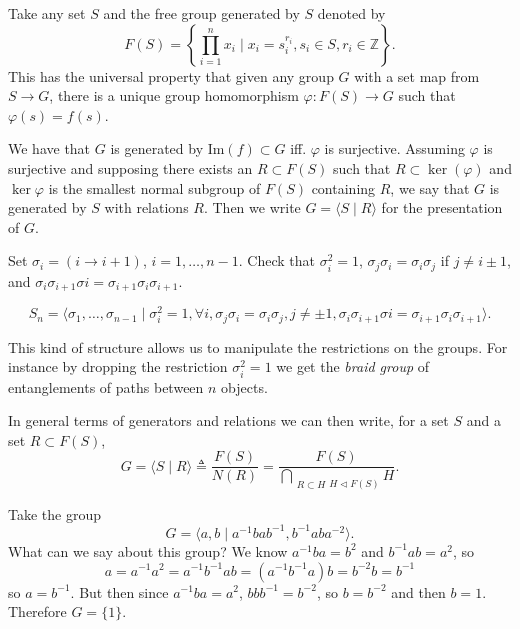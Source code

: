 \begin{defn}
Take any set $S$ and the
free group generated by $S$ denoted by
$$
F(S) = \left\{ \prod_{i = 1}^n x_i
         \mid x_i = s_i^{r_i}, s_i \in S,  r_i \in \mathbb{Z}
       \right\}.
$$
This has the universal property that given any group $G$ with a set
map from $S \to G$, there is a unique group homomorphism
$\varphi : F(S) \to G$ such that $\varphi(s) = f(s)$.

We have that $G$ is generated by $\mathrm{Im}(f) \subset G$
iff. $\varphi$ is surjective. Assuming $\varphi$ is surjective and
supposing there exists an $R \subset F(S)$ such that $R \subset
\ker(\varphi)$ and $\ker \varphi$ is the smallest normal subgroup of
$F(S)$ containing $R$, we say that $G$ is generated by $S$ with
relations $R$. Then we write $G = \langle S \mid R \rangle$ for the
presentation of $G$.
\end{defn}

\begin{xmpl}[Presentation of $S_n$]
Set $\sigma_i = (i \to i + 1)$, $i = 1, \dots, n - 1$. Check that
$\sigma_i^2 = 1$, $\sigma_j \sigma_i = \sigma_i \sigma_j$ if
$j \neq i \pm 1$, and
$\sigma_i \sigma_{i+1} \sigma{i} = \sigma_{i+1} \sigma_i
\sigma_{i+1}$.

\begin{theorem}
$$S_n = \langle \sigma_1, \dots, \sigma_{n-1}
         \mid \sigma_i^2 = 1, \forall i,
              \sigma_j \sigma_i = \sigma_i \sigma_j, j \neq \pm 1,
              \sigma_i \sigma_{i+1} \sigma{i} = \sigma_{i+1} \sigma_i
              \sigma_{i+1}
       \rangle.
$$
\end{theorem}
This kind of structure allows us to manipulate the restrictions on the
groups. For instance by dropping the restriction $\sigma_i^2 = 1$ we
get the \emph{braid group} of entanglements of paths between $n$ objects.
\end{xmpl}

In general terms of generators and relations we can then write, for a
set $S$ and a set $R \subset F(S)$,
$$
G = \langle S \mid R \rangle
  \triangleq \frac{F(S)}{N(R)}
  = \frac{F(S)}{\bigcap_{\substack{R \subset H}{H \triangleleft F(S)}} H}.
$$

\begin{xmpl}
Take the group
$$
G = \langle a, b \mid a^{-1} b a b^{-1}, b^{-1} a b a^{-2} \rangle.
$$
What can we say about this group? We know $a^{-1} b a = b^2$ and
$b^{-1} a b = a^2$, so
$$
a = a^{-1} a^2 = a^{-1} b^{-1} a b = (a^{-1} b^{-1} a) b = b^{-2} b = b^{-1}
$$
so $a = b^{-1}$. But then since $a^{-1} b a = a^2$, $b b b^{-1} =
b^{-2}$, so $b = b^{-2}$ and then $b = 1$. Therefore $G = \{ 1 \}$.
\end{xmpl}

